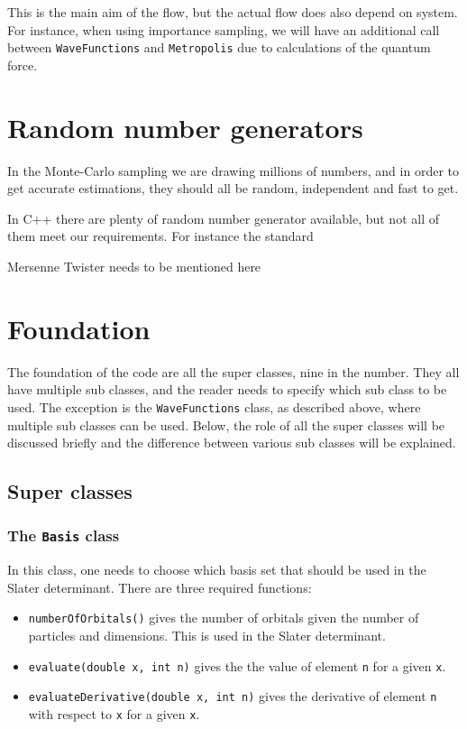 This is the main aim of the flow, but the actual flow does also depend on system. For instance, when using importance sampling, we will have an additional call between \lstinline{WaveFunctions} and \lstinline{Metropolis} due to calculations of the quantum force. 

\section{Random number generators} \label{sec:RNG}
In the Monte-Carlo sampling we are drawing millions of numbers, and in order to get accurate estimations, they should all be random, independent and fast to get. 

In C++ there are plenty of random number generator available, but not all of them meet our requirements. For instance the standard 

Mersenne Twister needs to be mentioned here

\iffalse
\section{Foundation} \label{subsec:foundation}
The foundation of the code are all the super classes, nine in the number. They all have multiple sub classes, and the reader needs to specify which sub class to be used. The exception is the \lstinline{WaveFunctions} class, as described above, where multiple sub classes can be used. Below, the role of all the super classes will be discussed briefly and the difference between various sub classes will be explained. 

\subsection{Super classes}

\subsubsection{The \lstinline{Basis} class}
In this class, one needs to choose which basis set that should be used in the Slater determinant. There are three required functions:
\begin{itemize}
	\item \lstinline{numberOfOrbitals()} gives the number of orbitals given the number of particles and dimensions. This is used in the Slater determinant.
	
	\item \lstinline{evaluate(double x, int n)} gives the the value of element \lstinline{n} for a given \lstinline{x}. 
	
	\item \lstinline{evaluateDerivative(double x, int n)} gives the derivative of element \lstinline{n} with respect to \lstinline{x} for a given \lstinline{x}.  
\end{itemize}

